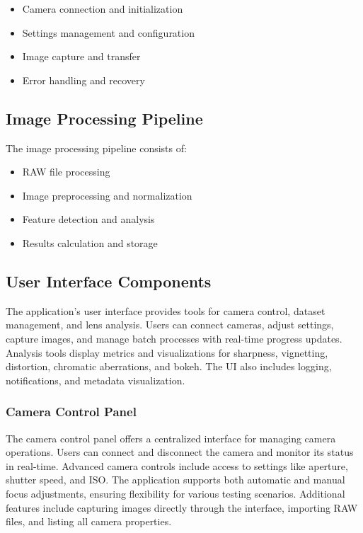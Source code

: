 \begin{itemize}
    \item Camera connection and initialization
    \item Settings management and configuration
    \item Image capture and transfer
    \item Error handling and recovery
\end{itemize}

\subsection{Image Processing Pipeline}
The image processing pipeline consists of:

\begin{itemize}
    \item RAW file processing
    \item Image preprocessing and normalization
    \item Feature detection and analysis
    \item Results calculation and storage
\end{itemize}

\subsection{User Interface Components}
The application’s user interface provides tools for camera control, dataset management, and lens analysis. Users can connect cameras, adjust settings, capture images, and manage batch processes with real-time progress updates. Analysis tools display metrics and visualizations for sharpness, vignetting, distortion, chromatic aberrations, and bokeh. The UI also includes logging, notifications, and metadata visualization.

\subsubsection{Camera Control Panel}
The camera control panel offers a centralized interface for managing camera operations. Users can connect and disconnect the camera and monitor its status in real-time. Advanced camera controls include access to settings like aperture, shutter speed, and ISO. The application supports both automatic and manual focus adjustments, ensuring flexibility for various testing scenarios. Additional features include capturing images directly through the interface, importing RAW files, and listing all camera properties.

